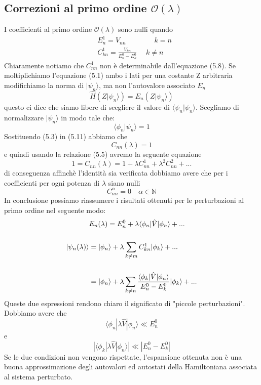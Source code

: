 \subsection{Correzioni al primo ordine $\mathcal{O}(\lambda)$}

I coefficienti al primo ordine $\mathcal{O}(\lambda)$ sono nulli quando
\begin{align}
	& E_n^1 = V_{nn} \quad \quad \quad\quad k = n \\[0.5cm]
	& C_{kn}^1 = \frac{V_{kn}}{E^0_n - E^0_k} \quad \;k \neq n
\end{align}
Chiaramente notiamo che $C_{nn}^1$ non \`e determinabile dall'equazione (5.8).  Se moltiplichiamo l'equazione (5.1) ambo i lati per una costante Z arbitraria modifichiamo la norma di $|\psi_n \rangle$, ma non l'autovalore associato $E_n$
\begin{equation*}
	\hat{H}(Z|\psi_n \rangle) = E_n (Z|\psi_n \rangle)
\end{equation*}
questo ci dice che siamo libere di scegliere il valore di $\langle \psi_n | \psi_n \rangle $. Scegliamo di normalizzare $|\psi_n \rangle$ in modo tale che: 
\begin{equation}
	\langle \phi_n | \psi_n \rangle = 1
\end{equation}
Sostituendo (5.3) in (5.11) abbiamo che 
\begin{equation*}
	C_{nn}( \lambda) = 1
\end{equation*} 
e quindi usando la relazione (5.5) avremo la seguente equazione
\begin{equation}
	1 = C_{nn}(\lambda) = 1 + \lambda C_{nn}^1 + \lambda^2 C_{nn}^2 + ...
\end{equation}
di conseguenza affinch\`e l'identit\`a sia verificata dobbiamo avere che per i coefficienti per ogni potenza di $\lambda$ siano nulli  
\begin{equation}
	C^{\alpha}_{nn} = 0 \quad \alpha \in \mathbb{N}
\end{equation}
In conclusione possiamo riassumere i risultati ottenuti per le perturbazioni al primo ordine nel seguente modo:
\begin{align}
	& E_n( \lambda) = E_n^0 + \lambda \langle \phi_n | \hat{V} | \phi_n \rangle + ... \\[0.5cm]
	|\psi_n(\lambda) \rangle &= |\phi_n \rangle + \lambda \sum_{k \neq m} C_{kn}^1|\phi_k 
	\rangle + ... \notag \\[0.5cm]
	& = |\phi_n \rangle  + \lambda \sum_{k \neq n} \frac{\langle \phi_k|\hat{V}|\phi_n \rangle}{E_n^0-E_k^0}|\phi_k \rangle + ...
\end{align}
Queste due espressioni rendono chiaro il significato di "piccole perturbazioni". Dobbiamo avere che 
\begin{equation*}
	\langle \phi_n| \lambda \hat{V}|\phi_n \rangle \ll E_n^0
\end{equation*}
e
\begin{equation*}
	| \langle \phi_k| \lambda \hat{V} | \phi_n \rangle | \ll |E_n^0 - E_k^0|
\end{equation*}
Se le due condizioni non vengono rispettate, l'espansione ottenuta non \`e una buona approssimazione degli autovalori ed autostati della Hamiltoniana associata al sistema perturbato.

